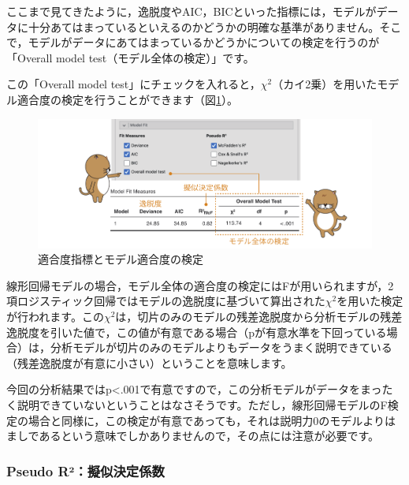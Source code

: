 \documentclass[
  12pt,
  a5jpaper,
  lualatex, ja=standard]{bxjsbook}
\begin{document}
ここまで見てきたように，逸脱度やAIC，BICといった指標には，モデルがデータに十分あてはまっているといえるのかどうかの明確な基準がありません。そこで，モデルがデータにあてはまっているかどうかについての検定を行うのが「Overall model test（モデル全体の検定）」です。

この「Overall model test」にチェックを入れると，\(\chi^{2}\)（カイ2乗）を用いたモデル適合度の検定を行うことができます（図\ref{fig:regression-binomial-overall}）。

\begin{figure}[!ht]

{\centering \includegraphics[width=1\linewidth]{images/regression/binomial-overall} 

}

\caption{適合度指標とモデル適合度の検定}\label{fig:regression-binomial-overall}
\end{figure}

線形回帰モデルの場合，モデル全体の適合度の検定にはFが用いられますが，2項ロジスティック回帰ではモデルの逸脱度に基づいて算出された\(\chi^{2}\)を用いた検定が行われます。この\(\chi^{2}\)は，切片のみのモデルの残差逸脱度から分析モデルの残差逸脱度を引いた値で，この値が有意である場合（pが有意水準を下回っている場合）は，分析モデルが切片のみのモデルよりもデータをうまく説明できている（残差逸脱度が有意に小さい）ということを意味します。

今回の分析結果ではp\textless.001で有意ですので，この分析モデルがデータをまったく説明できていないということはなさそうです。ただし，線形回帰モデルのF検定の場合と同様に，この検定が有意であっても，それは説明力0のモデルよりはましであるという意味でしかありませんので，その点には注意が必要です。

\hypertarget{pseudo-ruxb2ux64ecux4f3cux6c7aux5b9aux4fc2ux6570}{%
\subsubsection*{Pseudo R²：擬似決定係数}\label{pseudo-ruxb2ux64ecux4f3cux6c7aux5b9aux4fc2ux6570}}
\end{document}
